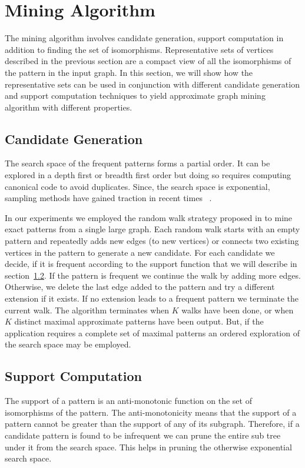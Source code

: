 \section{Mining Algorithm}
 The mining algorithm involves candidate generation, support computation in
 addition to finding the set of isomorphisms.  Representative sets of vertices
 described in the previous section are a compact view of all the isomorphisms of
 the pattern in the input graph. In this section, we will show how the
 representative sets can be used in conjunction with different candidate
 generation and support computation techniques to yield approximate graph mining
 algorithm with different properties.


\subsection{Candidate Generation} 

The search space of the frequent patterns forms a partial order.  It can be
explored in a depth first or breadth first order but doing so requires computing
canonical code to avoid duplicates. Since, the search space is exponential,
sampling methods have gained traction in recent
times~\cite{2008-origami:sadm,2009-graphsampling} . 


In our experiments we employed the random walk strategy proposed in
\cite{2011-icdm} to mine exact patterns from a single large graph. Each random
walk starts with an empty pattern and repeatedly adds new edges (to new
vertices) or connects two existing vertices in the pattern to generate a new
candidate.  For each candidate we decide,  if it is frequent according
to the support function that we will describe in section~\ref{sec:support}. If the
pattern is frequent we continue the walk by adding more edges. Otherwise, we
delete the last edge added to the pattern and try a different extension if it
exists. If no extension leads to a frequent pattern we terminate the current
walk.  The algorithm terminates when $K$ walks have been done, or when $K$
distinct maximal approximate patterns have been output. But, if the application
requires a complete set of maximal patterns an ordered exploration of the search
space may be employed.


\subsection{Support Computation} \label{sec:support} The support of a pattern is
an anti-monotonic function on the set of isomorphisms of the pattern. The
anti-monotonicity means that the support of a pattern cannot be greater than the
support of any of its subgraph. Therefore, if a candidate pattern is found to be
infrequent we can prune the entire sub tree under it from the search space.
This helps in pruning the otherwise exponential search space. 


